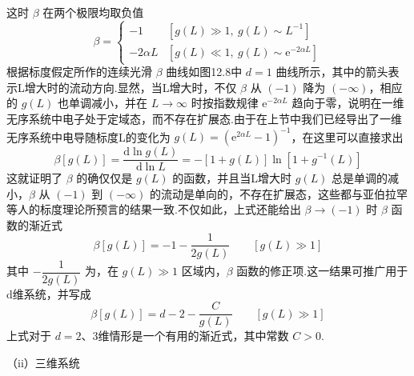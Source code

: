 这时 $\beta$ 在两个极限均取负值
\begin{equation}
  \beta=
  \begin{cases}
    -1 & \left[g\left(L\right)\gg1,\ g\left(L\right)\sim L^{-1}\right]\\
    -2\alpha L & \left[g\left(L\right)\ll1,\ g\left(L\right)\sim\mathrm{e}^{-2\alpha L}\right]
  \end{cases}
\end{equation}
根据标度假定所作的连续光滑 $\beta$ 曲线如图12.8中 $d=1$ 曲线所示，其中的箭头表示L增大时的流动方向.显然，当L增大时，不仅 $\beta$ 从 $\left(-1\right)$ 降为 $\left(-\infty\right)$，相应的 $g\left(L\right)$ 也单调减小，并在 $L\rightarrow\infty$ 时按指数规律 $\mathrm{e}^{-2\alpha L}$ 趋向于零，说明在一维无序系统中电子处于定域态，而不存在扩展态.由于在上节中我们已经导出了一维无序系统中电导随标度L的变化为 $g\left(L\right)=\left(\mathrm{e}^{2\alpha L}-1\right)^{-1}$，在这里可以直接求出
\begin{equation}
  \beta\left[g\left(L\right)\right]=\frac{\mathrm{d}\ln g\left(L\right)}{\mathrm{d}\ln L}
  =-\left[1+g\left(L\right)\right]\ln\left[1+g^{-1}\left(L\right)\right]
\end{equation}
这就证明了 $\beta$ 的确仅仅是 $g\left(L\right)$ 的函数，并且当L增大时 $g\left(L\right)$ 总是单调的减小，$\beta$ 从 $\left(-1\right)$ 到 $\left(-\infty\right)$ 的流动是单向的，不存在扩展态，这些都与亚伯拉罕等人的标度理论所预言的结果一致.不仅如此，上式还能给出 $\beta\rightarrow\left(-1\right)$ 时 $\beta$ 函数的渐近式
\begin{equation}
  \beta\left[g\left(L\right)\right]=-1-\frac{1}{2g\left(L\right)}
  \qquad\left[g\left(L\right)\gg1\right]
\end{equation}
其中 $-\dfrac{1}{2g\left(L\right)}$ 为，在 $g\left(L\right)\gg1$ 区域内，$\beta$ 函数的修正项.这一结果可推广用于d维系统，并写成
\begin{equation}
  \beta\left[g\left(L\right)\right]=d-2-\frac{C}{g\left(L\right)}
  \qquad\left[g\left(L\right)\gg1\right]
\end{equation}
上式对于 $d=2$、3维情形是一个有用的渐近式，其中常数 $C>0$.

（ii）三维系统

